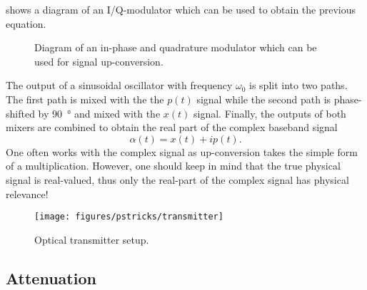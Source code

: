  shows a diagram of an I/Q-modulator which can be used to obtain the previous equation.
\begin{figure}[htb]
	\centering
	
	\caption{Diagram of an in-phase and quadrature modulator which can be used for signal up-conversion.}\label{fig:iqmod}
\end{figure}
The output of a sinusoidal oscillator with frequency $\omega_0$ is split into two paths.
The first path is mixed with the the $p(t)$ signal while the second path is phase-shifted by \SI{90}{\degree} and mixed with the $x(t)$ signal.
Finally, the outputs of both mixers are combined to obtain the real part of the complex baseband signal
\begin{equation}
	\alpha(t)
	=
	x(t)
	+
	ip(t)
	.
\end{equation}
One often works with the complex signal as up-conversion takes the simple form of a multiplication.
However, one should keep in mind that the true physical signal is real-valued, thus only the real-part of the complex signal has physical relevance!

\begin{figure}[htb]
	\centering
	\texttt{[image: figures/pstricks/transmitter]}
	\caption{Optical transmitter setup.}
\end{figure}

\FloatBarrier

\subsection{Attenuation}

